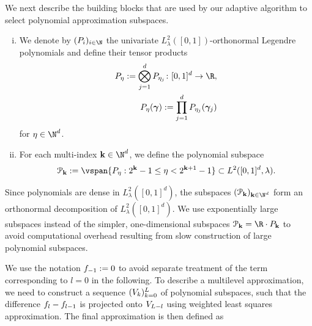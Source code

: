  We next describe the building blocks that are used by our adaptive algorithm to select polynomial approximation subspaces.
\begin{definition}\leavevmode
\begin{enumerate}[(i)]
	\item We denote by $(\leg_i)_{i\in\N}$ the univariate $L^2_{\lambda}([0,1])$-orthonormal Legendre polynomials and define their tensor products
	\begin{equation*}
	\begin{split}
	\leg_{\mip}:=\bigotimes_{j=1}^\dps\leg_{\mip_j}\colon [0,1]^d\to\R,\\
	\leg_{\mip}(\psmi):=\prod_{j=1}^{d}\leg_{\mip_j}(\psmi_j)
	\end{split}
	\end{equation*}
	 for $\mip\in\N^\dps$.
\item For each multi-index $\mi\in\N^{d}$, we define the polynomial subspace
\begin{equation*}
\pss_{\mi}:=\vspan\{\leg_{\mip}:2^{\mi}-1\leq\mip< 2^{\mi+1}-1\}\subset L^2([0,1]^d,\lambda).
\end{equation*}

\end{enumerate}
\end{definition}
\begin{rem}
	Since polynomials are dense in $L^2_{\lambda}([0,1]^d)$, the subspaces $(\pss_{\mi})_{\mi\in\N^d}$ form an orthonormal decomposition of $L^2_{\lambda}([0,1]^d)$. 	We use exponentially large subspaces instead of the simpler, one-dimensional subspaces $\pss_{\mi}=\R\cdot\leg_{\mi}$ to avoid computational overhead resulting from slow construction of large polynomial subspaces.
\end{rem}
We use the notation $f_{-1}:=0$ to avoid separate treatment of the term corresponding to $l=0$ in the following.
To describe a multilevel approximation, %
 we need to construct a sequence $(V_k)_{k=0}^{L}$ of polynomial subspaces, such that the difference $f_{l}-f_{l-1}$ is projected onto $V_{L-l}$ using weighted least squares approximation. The final approximation is then defined as 

